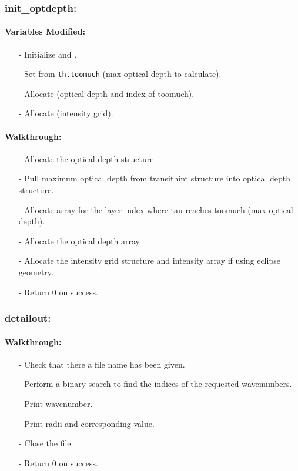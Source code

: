 \documentclass[letterpaper,12pt]{article}
\begin{document}
\subsubsection{init\_optdepth:}
\paragraph{Variables Modified:}
\begin{enumerate}[leftmargin=10pt, noitemsep, parsep=0pt, topsep=0ex]
\item[-] Initialize  and .
\item[-] Set  from {\tt th.toomuch} (max
  optical depth to calculate).
\item[-] Allocate  (optical depth and
  index of toomuch).
\item[-] Allocate  (intensity grid).
\end{enumerate}

\paragraph{Walkthrough:}
\begin{enumerate}[leftmargin=10pt, noitemsep, parsep=0pt, topsep=0ex]
\item[-] Allocate the optical depth structure.
\item[-] Pull maximum optical depth from transithint structure into optical depth structure.
\item[-] Allocate array for the layer index where tau reaches toomuch (max optical depth).
\item[-] Allocate the optical depth array
\item[-] Allocate the intensity grid structure and intensity array if using eclipse geometry.
\item[-] Return 0 on success.
\end{enumerate}

\subsubsection{detailout:}
\paragraph{Walkthrough:}
\begin{enumerate}[leftmargin=10pt, noitemsep, parsep=0pt, topsep=0ex]
\item[-] Check that there a file name has been given.
\item[-] Perform a binary search to find the indices of the requested wavenumbers.
\item[-] Print wavenumber.
\item[-] Print radii and corresponding value.
\item[-] Close the file.
\item[-] Return 0 on success.
\end{enumerate}
\end{document}
